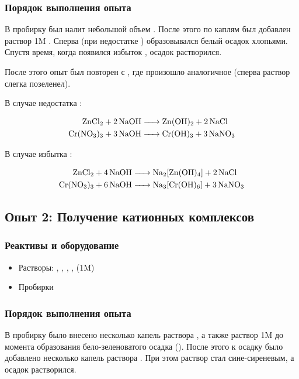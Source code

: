 \documentclass[a4paper, 12pt]{article}
\begin{document}
\subsubsection{Порядок выполнения опыта}

В пробирку был налит небольшой объем . После этого по каплям был добавлен раствор 1M . Сперва (при недостатке ) образовывался белый осадок хлопьями. Спустя время, когда появился избыток , осадок растворился.

После этого опыт был повторен с , где произошло аналогичное (сперва раствор слегка позеленел).

В случае недостатка :

\begin{align}
	\ce{ZnCl2 + 2NaOH &-> Zn(OH)2 + 2 NaCl}\\
	\ce{Cr(NO3)3 + 3 NaOH &-> Cr(OH)3 + 3NaNO3}
\end{align}

В случае избытка :

\begin{align}
	\ce{ZnCl2 + 4NaOH &-> Na2[Zn(OH)4] + 2NaCl}\\
	\ce{Cr(NO3)3 + 6 NaOH &-> Na3[Cr(OH)6] + 3NaNO3}
\end{align}



\subsection{Опыт 2: Получение катионных комплексов}

\subsubsection{Реактивы и оборудование}

\begin{itemize}
	\item Растворы: , , , ,  (1M)
	
	\item Пробирки
\end{itemize}

\subsubsection{Порядок выполнения опыта}

В пробирку было внесено несколько капель раствора , а также раствор 1M  до момента образования бело-зеленоватого осадка (). После этого к осадку было добавлено несколько капель раствора . При этом раствор стал сине-сиреневым, а осадок растворился.
\end{document}
